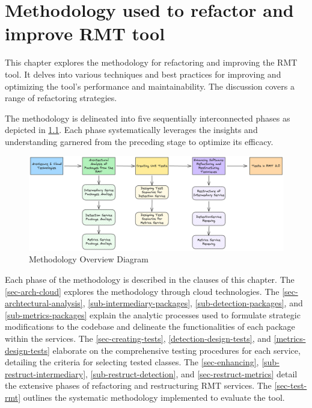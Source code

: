 \chapter{Methodology used to refactor and improve RMT tool}%
\label{methodology}

This chapter explores the methodology for refactoring and improving the RMT tool. It delves into various techniques and best practices for improving and optimizing the tool's performance and maintainability. The discussion covers a range of refactoring strategies.

The methodology is delineated into five sequentially interconnected phases as depicted in \cref{fig-overview-methodology}. Each phase systematically leverages the insights and understanding garnered from the preceding stage to optimize its efficacy.

\begin{figure}[ht!]
\SetCaptionWidth{\textwidth}
\caption{Methodology Overview Diagram}
\label{fig-overview-methodology}
\includegraphics[width =\textwidth]{Chapter-4/Figures/Metodologia.png}
\end{figure}
\FloatBarrier


Each phase of the methodology is described in the clauses of this chapter. The \cref{sec-arch-cloud} explores the methodology through cloud technologies. The \cref{sec-archtectural-analysis}, \ref{sub-intermediary-packages}, \ref{sub-detection-packages}, and \ref{sub-metrics-packages} explain the analytic processes used to formulate strategic modifications to the codebase and delineate the functionalities of each package within the services. The \cref{sec-creating-tests}, \ref{detection-design-tests}, and \ref{metrics-design-tests} elaborate on the comprehensive testing procedures for each service, detailing the criteria for selecting tested classes. The \cref{sec-enhancing}, \ref{sub-restruct-intermediary}, \ref{sub-restruct-detection}, and \ref{sec-restruct-metrics} detail the extensive phases of refactoring and restructuring RMT services. The \cref{sec-test-rmt} outlines the systematic methodology implemented to evaluate the tool.

